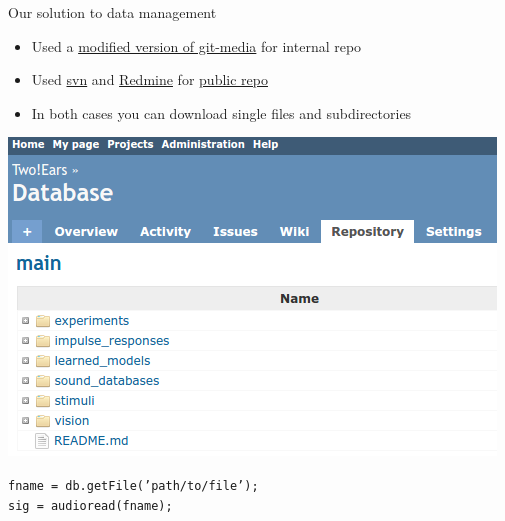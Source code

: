 \documentclass{beamer}
\begin{document}
\begin{frame}[fragile]{Our solution to data management}

    \begin{itemize}
        \item Used a \href{https://github.com/TWOEARS/git-media}{modified version
            of git-media} for internal repo \\
        \item Used \href{https://subversion.apache.org}{svn} and
            \href{http://www.redmine.org}{Redmine} for
            \href{https://dev.qu.tu-berlin.de/projects/twoears-getdata/repository}{public
            repo}
        \item In both cases you can download single files and subdirectories
    \end{itemize}

    \vspace{0.5cm}

    \begin{minipage}[b]{.4\columnwidth}
        \includegraphics[width=.9\textwidth]{fig/redmine}
    \end{minipage}
    \hfill
    \begin{minipage}[b]{.59\columnwidth}
        \small
        \texttt{fname = db.getFile('path/to/file');} \\
        \texttt{sig = audioread(fname);}

        \vspace{1cm}

    \end{minipage}

\end{frame}
\end{document}
